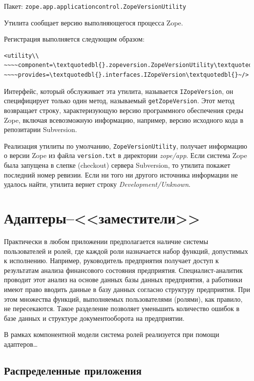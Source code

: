 \documentclass[a4paper,openany,twoside,draft]{book}
\providecommand*{\DUroletitlereference}[1]{\textsl{#1}}
\begin{document}
Пакет: \texttt{zope.app.applicationcontrol.ZopeVersionUtility}

Утилита сообщает версию выполняющегося процесса Zope.

Регистрация выполняется следующим образом:

\begin{verbatim}
<utility\\
~~~~component=\textquotedbl{}.zopeversion.ZopeVersionUtility\textquotedbl{}\\
~~~~provides=\textquotedbl{}.interfaces.IZopeVersion\textquotedbl{}~/>
\end{verbatim}

Интерфейс, который обслуживает эта утилита, называется
\texttt{IZopeVersion}, он специфицирует только один метод, называемый
\texttt{getZopeVersion}.  Этот метод возвращает строку, характеризующую
версию программного обеспечения среды Zope, включая всевозможную
информацию, например, версию исходного кода в репозитарии Subversion.

Реализация утилиты по умолчанию, \texttt{ZopeVersionUtility}, получает
информацию о версии Zope из файла \texttt{version.txt} в директории
\DUroletitlereference{zope/app}.  Если система Zope была запущена в слепке (checkout)
сервера Subversion, то утилита покажет последний номер ревизии.  Если
ни того ни другого источника информации не удалось найти, утилита
вернет строку \DUroletitlereference{Development/Unknown}.

\section{Адаптеры--<<заместители>>}
\label{sec:proxyadapters}

Практически в любом приложении предполагается наличие системы пользователей и ролей, где каждой роли назначается набор функций, допустимых к исполнению.  Например, руководитель предприятия получает доступ к результатам анализа финансового состояния предприятия.  Специалист-аналитик проводит этот анализ на основе данных базы данных предприятия, а работники имеют право вводить данные в базу данных согласно структуру предприятия.  При этом множества функций, выполняемых пользователями (ролями), как правило, не пересекаются.  Такое разделение позволяет уменьшить количество ошибок в базе данных и структуре документооборота на предприятии.

В рамках компонентной модели система ролей реализуется при помощи адаптеров\ldots{}

\subsection{Распределенные приложения}
\label{sec:distributedapps}
\end{document}

